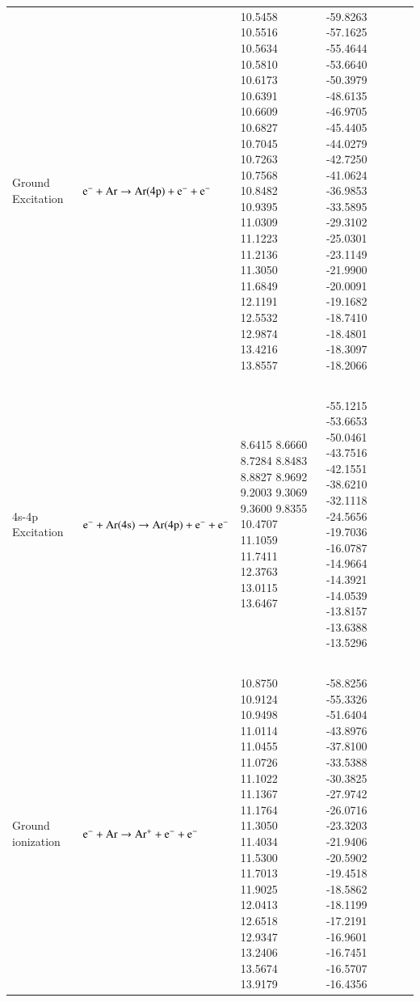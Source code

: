 \documentclass{warpdoc}
\begin{document}
\begin{table}[!ht]
\begin{threeparttable}
\begin{tabular*}{\textwidth}{@{}l@{\extracolsep{\fill}}lll@{}}
Ground Excitation & ~{$\rm e^- + Ar \rightarrow Ar(4p) + e^- + e^-$  } &   \begin{minipage}[t]{0.28\textwidth}\raggedright  
      10.5458
      10.5516
      10.5634
      10.5810
      10.6173
      10.6391
      10.6609
      10.6827
      10.7045
      10.7263
      10.7568
      10.8482
      10.9395
      11.0309
      11.1223
      11.2136
      11.3050
      11.6849
      12.1191
      12.5532
      12.9874
      13.4216
      13.8557
 \end{minipage}  & \begin{minipage}[t]{0.28\textwidth}\raggedright 
      -59.8263
      -57.1625
      -55.4644
      -53.6640
      -50.3979
      -48.6135
      -46.9705
      -45.4405
      -44.0279
      -42.7250
      -41.0624
      -36.9853
      -33.5895
      -29.3102
      -25.0301
      -23.1149
      -21.9900
      -20.0091
      -19.1682
      -18.7410
      -18.4801
      -18.3097
      -18.2066
\end{minipage} \\         
~\\
4s-4p Excitation & ~{$\rm e^- + Ar(4s) \rightarrow Ar(4p) + e^- + e^-$  } &   \begin{minipage}[t]{0.28\textwidth}\raggedright  
8.6415
8.6660
8.7284
8.8483
8.8827
8.9692
9.2003
9.3069
9.3600
9.8355
10.4707
11.1059
11.7411
12.3763
13.0115
13.6467
 \end{minipage}  & \begin{minipage}[t]{0.28\textwidth}\raggedright 
-55.1215
-53.6653
-50.0461
-43.7516
-42.1551
-38.6210
-32.1118
-24.5656
-19.7036
-16.0787
-14.9664
-14.3921
-14.0539
-13.8157
-13.6388
-13.5296
\end{minipage} \\         
~\\


Ground ionization & ~{$\rm e^- + Ar \rightarrow Ar^+ + e^- + e^-$  } &   \begin{minipage}[t]{0.28\textwidth}\raggedright  

10.8750
10.9124
10.9498
11.0114
11.0455
11.0726
11.1022
11.1367
11.1764
11.3050
11.4034
11.5300
11.7013
11.9025
12.0413
12.6518
12.9347
13.2406
13.5674
13.9179
 \end{minipage}  & \begin{minipage}[t]{0.28\textwidth}\raggedright 
-58.8256
-55.3326
-51.6404
-43.8976
-37.8100
-33.5388
-30.3825
-27.9742
-26.0716
-23.3203
-21.9406
-20.5902
-19.4518
-18.5862
-18.1199
-17.2191
-16.9601
-16.7451
-16.5707
-16.4356



\end{minipage}
\end{tabular*}
\end{threeparttable}
\end{table}
\end{document}
